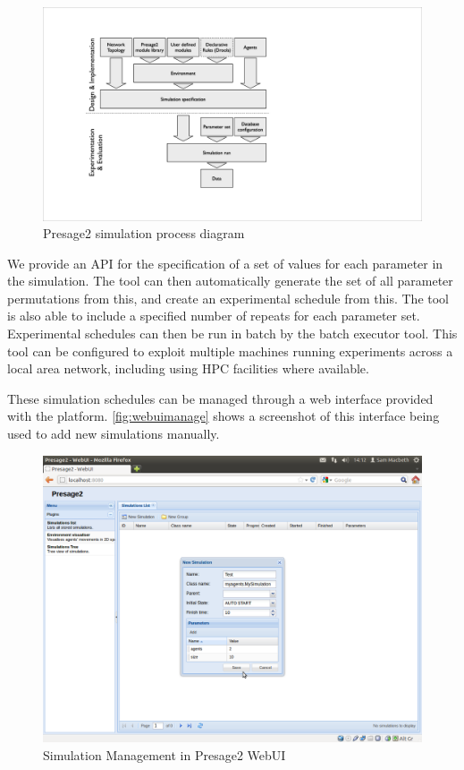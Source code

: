 \begin{figure}
\caption{Presage2 simulation process diagram}\label{fig:presage2process}
\includegraphics[width=\linewidth]{gfx/presage2/simulation_process}
\end{figure}

We provide an \ac{API} for the specification of a set of values for each
parameter in the simulation. The tool can then automatically generate the set of
all parameter permutations from this, and create an experimental schedule from
this. The tool is also able to include a specified number of repeats for each
parameter set. Experimental schedules can then be run in batch by the batch
executor tool. This tool can be configured to exploit multiple machines running
experiments across a local area network, including using \ac{HPC} facilities
where available.

These simulation schedules can be managed through a web interface provided with
the platform. \autoref{fig:webuimanage} shows a screenshot of this interface
being used to add new simulations manually.

\begin{figure}
\caption{Simulation Management in Presage2 WebUI}\label{fig:webuimanage}
\includegraphics[width=\linewidth]{gfx/presage2/webui_manage}
\end{figure}

